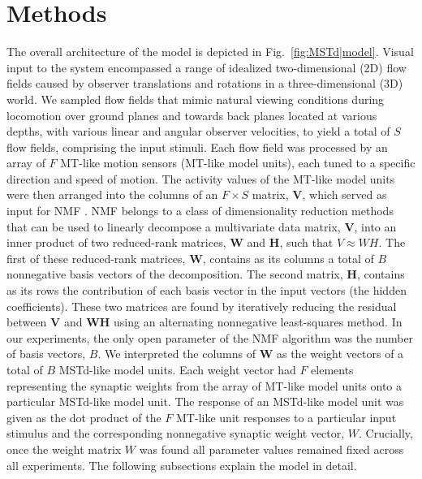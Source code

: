 \section{Methods}
\label{sec:MSTd|methods}
The overall architecture of the model is depicted in Fig.~\ref{fig:MSTd|model}.
Visual input to the system encompassed a range of idealized two-dimensional (2D) 
flow fields caused by observer translations and rotations in a three-dimensional (3D)
world. We sampled flow fields that mimic natural viewing conditions during locomotion 
over ground planes and towards back planes located at various depths, with various 
linear and angular observer velocities, to yield a total of $S$ flow fields, 
comprising the input stimuli. Each flow field was processed by an array of $F$ 
\ac{MT}-like motion sensors (\ac{MT}-like model units), each tuned to a specific 
direction and speed of motion. 
The activity values of the \ac{MT}-like model units were then arranged into the 
columns of an $F \times S$ matrix, $\mathbf{V}$, which served as input for \acf{NMF}
\citep{PaateroTapper1994,LeeSeung1999,LeeSeung2001}.
\ac{NMF} belongs to a class of dimensionality reduction methods that can be used 
to linearly decompose a multivariate data matrix, $\mathbf{V}$, into an inner product
of two reduced-rank matrices, $\mathbf{W}$ and $\mathbf{H}$, such that $V \approx WH$. 
The first of these reduced-rank matrices, $\mathbf{W}$, contains as its columns a 
total of $B$ nonnegative basis vectors of the decomposition. 
The second matrix, $\mathbf{H}$, contains as its rows the contribution of each 
basis vector in the input vectors (the hidden coefficients). 
These two matrices are found by iteratively reducing the residual between $\mathbf{V}$
and $\mathbf{WH}$ using an alternating nonnegative least-squares method. 
In our experiments, the only open parameter of the \ac{NMF} algorithm was the number 
of basis vectors, $B$. We interpreted the columns of $\mathbf{W}$ as the weight vectors
of a total of $B$ \ac{MSTd}-like model units. Each weight vector had $F$ elements
representing the synaptic weights from the array of \ac{MT}-like model units onto a
particular \ac{MSTd}-like model unit. The response of an \ac{MSTd}-like model unit 
was given as the dot product of the $F$ \ac{MT}-like unit responses to a particular
input stimulus and the corresponding nonnegative synaptic weight vector, $W$. 
Crucially, once the weight matrix $W$ was found all parameter values remained fixed 
across all experiments. The following subsections explain the model in detail.

